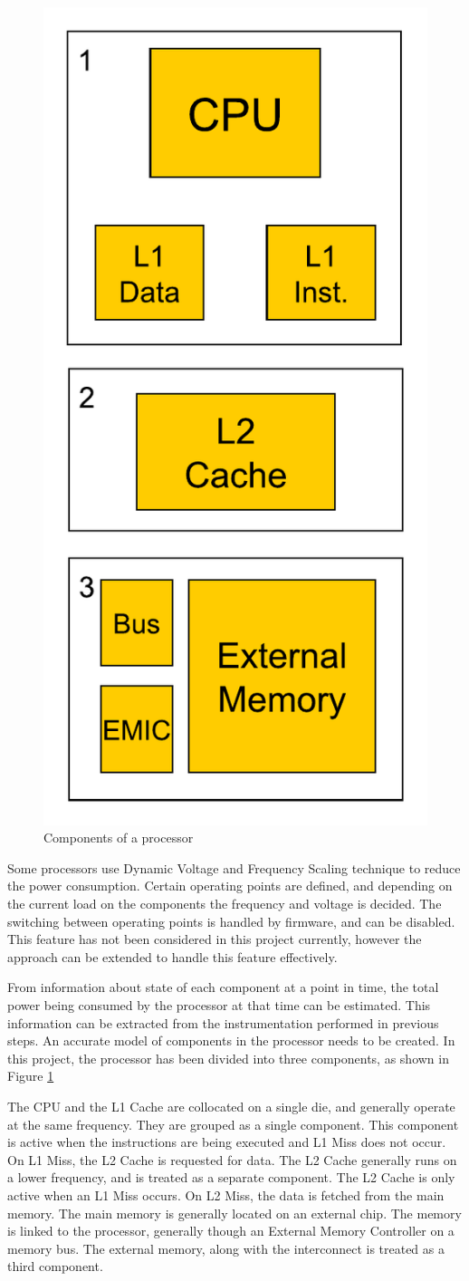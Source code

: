 \begin{figure}
\vspace{-30pt}
\begin{center}
\includegraphics[width=.28\textwidth]{figures/components.pdf}
\end{center}
\vspace{-20pt}
\caption{Components of a processor}
\vspace{-20pt}
\label{fig:components}
\end{figure}

Some processors use Dynamic Voltage and Frequency Scaling technique to reduce the power consumption. Certain operating points are defined, and depending on the current load on the components the frequency and voltage is decided. The switching between operating points is handled by firmware, and can be disabled. This feature has not been considered in this project currently, however the approach can be extended to handle this feature effectively.

From information about state of each component at a point in time, the total power being consumed by the processor at that time can be estimated. This information can be extracted from the instrumentation performed in previous steps. An accurate model of components in the processor needs to be created. In this project, the processor has been divided into three components, as shown in Figure \ref{fig:components}

The CPU and the L1 Cache are collocated on a single die, and generally operate at the same frequency. They are grouped as a single component. This component is active when the instructions are being executed and L1 Miss does not occur. On L1 Miss, the L2 Cache is requested for data. The L2 Cache generally runs on a lower frequency, and is treated as a separate component. The L2 Cache is only active when an L1 Miss occurs. On L2 Miss, the data is fetched from the main memory. The main memory is generally located on an external chip. The memory is linked to the processor, generally though an External Memory Controller on a memory bus. The external memory, along with the interconnect is treated as a third component.

